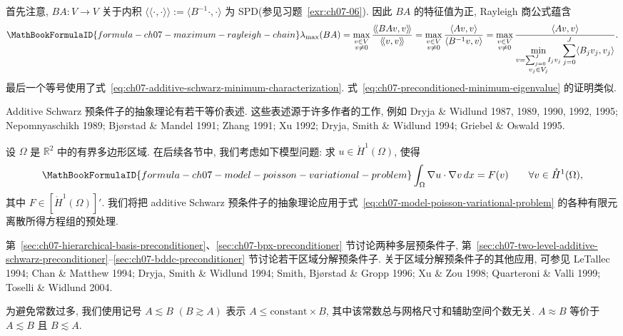 \begin{Proof}
首先注意, $BA:V\longrightarrow V$ 关于内积 $\langle\!\langle\cdot,\cdot\rangle\!\rangle:=\langle B^{-1}\cdot,\cdot\rangle$ 为 SPD(参见习题~\ref{exr:ch07-06}). 因此 $BA$ 的特征值为正, Rayleigh 商公式蕴含
\[
\MathBookFormulaID{formula-ch07-maximum-rayleigh-chain}
\lambda_{\max}(BA)
=\max_{\substack{v\in V\\v\neq0}}
\frac{\langle\!\langle BAv,v\rangle\!\rangle}{\langle\!\langle v,v\rangle\!\rangle}
=\max_{\substack{v\in V\\v\neq0}}
\frac{\langle Av,v\rangle}{\langle B^{-1}v,v\rangle}
=\max_{\substack{v\in V\\v\neq0}}
\frac{\langle Av,v\rangle}
{\displaystyle\min_{\substack{v=\sum_{j=0}^{J}I_jv_j\\v_j\in V_j}}
\sum_{j=0}^{J}\langle B_jv_j,v_j\rangle}.
\]
最后一个等号使用了式~\eqref{eq:ch07-additive-schwarz-minimum-characterization}. 式~\eqref{eq:ch07-preconditioned-minimum-eigenvalue} 的证明类似.
\end{Proof}

\begin{Remark}
\label{rem:ch07-additive-schwarz-equivalent-formulations}
Additive Schwarz 预条件子的抽象理论有若干等价表述. 这些表述源于许多作者的工作, 例如 Dryja \& Widlund 1987, 1989, 1990, 1992, 1995; Nepomnyaschikh 1989; Bjørstad \& Mandel 1991; Zhang 1991; Xu 1992; Dryja, Smith \& Widlund 1994; Griebel \& Oswald 1995.
\end{Remark}

设 $\Omega$ 是 $\mathbb R^2$ 中的有界多边形区域. 在后续各节中, 我们考虑如下模型问题: 求 $u\in\mathring H^1(\Omega)$, 使得
\begin{equation}
\MathBookFormulaID{formula-ch07-model-poisson-variational-problem}
\label{eq:ch07-model-poisson-variational-problem}
\int_\Omega\nabla u\cdot\nabla v\,dx=F(v)
\qquad\forall v\in\mathring H^1(\Omega),
\end{equation}
其中 $F\in[\mathring H^1(\Omega)]'$. 我们将把 additive Schwarz 预条件子的抽象理论应用于式~\eqref{eq:ch07-model-poisson-variational-problem} 的各种有限元离散所得方程组的预处理.

第~\ref{sec:ch07-hierarchical-basis-preconditioner}、\ref{sec:ch07-bpx-preconditioner} 节讨论两种多层预条件子, 第~\ref{sec:ch07-two-level-additive-schwarz-preconditioner}--\ref{sec:ch07-bddc-preconditioner} 节讨论若干区域分解预条件子. 关于区域分解预条件子的其他应用, 可参见 LeTallec 1994; Chan \& Matthew 1994; Dryja, Smith \& Widlund 1994; Smith, Bjørstad \& Gropp 1996; Xu \& Zou 1998; Quarteroni \& Valli 1999; Toselli \& Widlund 2004.

为避免常数过多, 我们使用记号 $A\lesssim B$ $(B\gtrsim A)$ 表示 $A\leq\text{constant}\times B$, 其中该常数总与网格尺寸和辅助空间个数无关. $A\approx B$ 等价于 $A\lesssim B$ 且 $B\lesssim A$.

